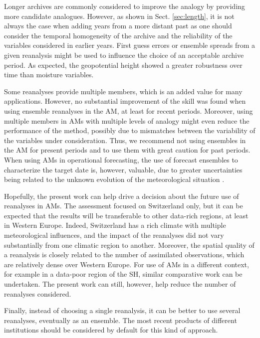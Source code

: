 \documentclass[smallextended]{svjour3}       %
\begin{document}
	Longer archives are commonly considered to improve the analogy by providing more candidate analogues. However, as shown in Sect. \ref{sec:length}, it is not always the case when adding years from a more distant past as one should consider the temporal homogeneity of the archive and the reliability of the variables considered in earlier years. First guess errors or ensemble spreads from a given reanalysis might be used to influence the choice of an acceptable archive period. As expected, the geopotential height showed a greater robustness over time than moisture variables. 
	
	Some reanalyses provide multiple members, which is an added value for many applications. However, no substantial improvement of the skill was found when using ensemble reanalyses in the AM, at least for recent periods. Moreover, using multiple members in AMs with multiple levels of analogy might even reduce the performance of the method, possibly due to mismatches between the variability of the variables under consideration. Thus, we recommend not using ensembles in the AM for present periods and to use them with great caution for past periods. When using AMs in operational forecasting, the use of forecast ensembles to characterize the target date is, however, valuable, due to greater uncertainties being related to the unknown evolution of the meteorological situation \citep{Thevenot2004}.
	
	Hopefully, the present work can help drive a decision about the future use of reanalyses in AMs. The assessment focused on Switzerland only, but it can be expected that the results will be transferable to other data-rich regions, at least in Western Europe. Indeed, Switzerland has a rich climate with multiple meteorological influences, and the impact of the reanalyses did not vary substantially from one climatic region to another. Moreover, the spatial quality of a reanalysis is closely related to the number of assimilated observations, which are relatively dense over Western Europe. For use of AMs in a different context, for example in a data-poor region of the SH, similar comparative work can be undertaken. The present work can still, however, help reduce the number of reanalyses considered.
	
	Finally, instead of choosing a single reanalysis, it can be better to use several reanalyses, eventually as an ensemble. The most recent products of different institutions should be considered by default for this kind of approach.
	
	
	
\end{document}
